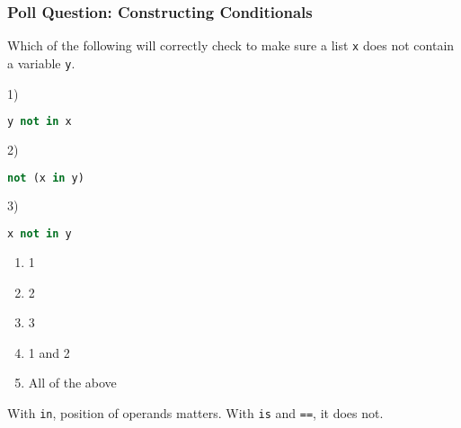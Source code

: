 \documentclass{beamer}
\begin{document}
%
%
\begin{frame}[fragile]
	\frametitle{Poll Question: Constructing Conditionals}
  Which of the following will correctly check to make sure a list \lstinline|x| does not contain a variable \lstinline|y|.

	\begin{minipage}{0.69\textwidth}
    1)
		\begin{lstlisting}[language=Python, autogobble,basicstyle=\tiny,numbers=none]
    y not in x
		\end{lstlisting}
    \vspace{.5cm}
    2)
		\begin{lstlisting}[language=Python, autogobble,basicstyle=\tiny,numbers=none]
    not (x in y)
		\end{lstlisting}
    \vspace{.5cm}
    3)
		\begin{lstlisting}[language=Python, autogobble,basicstyle=\tiny,numbers=none]
    x not in y
		\end{lstlisting}
	\end{minipage}
	\begin{minipage}{0.29\textwidth}
    \begin{enumerate}[A]
      \item 1
      \item 2
      \item 3
      \item 1 and 2
      \item All of the above
    \end{enumerate}
	\end{minipage}
  \vfill
  \pause
  With \lstinline|in|, position of operands matters. With \lstinline|is| and \lstinline|==|, it does not.
\end{frame}
\end{document}
